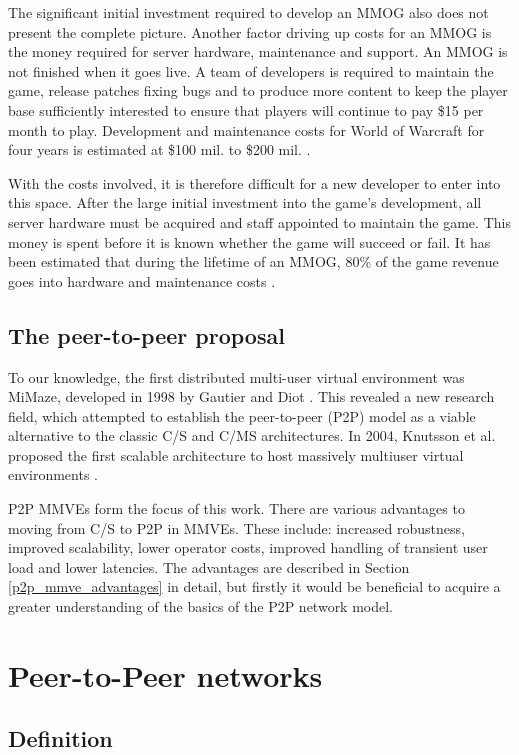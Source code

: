 The significant initial investment required to develop an MMOG also does not present the complete picture. Another factor driving up costs for an MMOG is the money required for server hardware, maintenance and support. An MMOG is not finished when it goes live. A team of developers is required to maintain the game, release patches fixing bugs and to produce more content to keep the player base sufficiently interested to ensure that players will continue to pay \$15 per month to play. Development and maintenance costs for World of Warcraft for four years is estimated at \$100 mil. to \$200 mil. \cite{wow_cost}.

With the costs involved, it is therefore difficult for a new developer to enter into this space. After the large initial investment into the game's development, all server hardware must be acquired and staff appointed to maintain the game. This money is spent before it is known whether the game will succeed or fail. It has been estimated that during the lifetime of an MMOG, 80\% of the game revenue goes into hardware and maintenance costs \cite{cs_mmog_cost}.

\subsection{The peer-to-peer proposal}

To our knowledge, the first distributed multi-user virtual environment was MiMaze, developed in 1998 by Gautier and Diot \cite{mimaze}. This revealed a new research field, which attempted to establish the peer-to-peer (P2P) model as a viable alternative to the classic C/S and C/MS architectures. In 2004, Knutsson et al. proposed the first scalable architecture to host massively multiuser virtual environments  \cite{knutsson_p2p_first}.

P2P MMVEs form the focus of this work. There are various advantages to moving from C/S to P2P in MMVEs. These include: increased robustness, improved scalability, lower operator costs, improved handling of transient user load and lower latencies. The advantages are described in Section \ref{p2p_mmve_advantages} in detail, but firstly it would be beneficial to acquire a greater understanding of the basics of the P2P network model.

\section{Peer-to-Peer networks}

\subsection{Definition}

